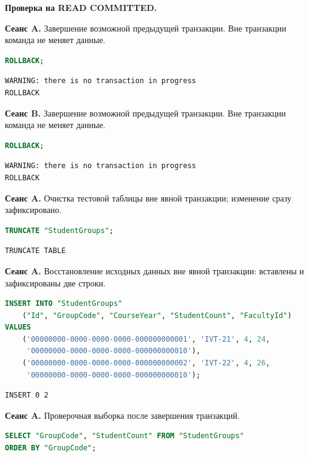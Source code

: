 \documentclass[12pt,a4paper]{article}
\begin{document}
\textbf{Проверка на READ COMMITTED.}

\textbf{Сеанс A.} Завершение возможной предыдущей транзакции. Вне транзакции команда не меняет данные.
\begin{lstlisting}[language=SQL]
ROLLBACK;
\end{lstlisting}

\begin{lstlisting}
WARNING: there is no transaction in progress
ROLLBACK
\end{lstlisting}

\textbf{Сеанс B.} Завершение возможной предыдущей транзакции. Вне транзакции команда не меняет данные.
\begin{lstlisting}[language=SQL]
ROLLBACK;
\end{lstlisting}

\begin{lstlisting}
WARNING: there is no transaction in progress
ROLLBACK
\end{lstlisting}

\textbf{Сеанс A.} Очистка тестовой таблицы вне явной транзакции; изменение сразу зафиксировано.
\begin{lstlisting}[language=SQL]
TRUNCATE "StudentGroups";
\end{lstlisting}

\begin{lstlisting}
TRUNCATE TABLE
\end{lstlisting}

\textbf{Сеанс A.} Восстановление исходных данных вне явной транзакции: вставлены и зафиксированы две строки.
\begin{lstlisting}[language=SQL]
INSERT INTO "StudentGroups"
    ("Id", "GroupCode", "CourseYear", "StudentCount", "FacultyId")
VALUES
    ('00000000-0000-0000-0000-000000000001', 'IVT-21', 4, 24,
     '00000000-0000-0000-0000-000000000010'),
    ('00000000-0000-0000-0000-000000000002', 'IVT-22', 4, 26,
     '00000000-0000-0000-0000-000000000010');
\end{lstlisting}

\begin{lstlisting}
INSERT 0 2
\end{lstlisting}

\textbf{Сеанс A.} Проверочная выборка после завершения транзакций.
\begin{lstlisting}[language=SQL]
SELECT "GroupCode", "StudentCount" FROM "StudentGroups"
ORDER BY "GroupCode";
\end{lstlisting}
\end{document}
